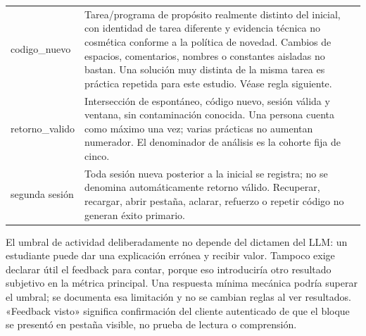 \documentclass[11pt,a4paper]{report}
\begin{document}
\begin{longtable}{P{3.1cm}P{12.9cm}}
codigo\_nuevo & Tarea/programa de propósito realmente distinto del inicial, con identidad de tarea diferente y evidencia técnica no cosmética conforme a la política de novedad. Cambios de espacios, comentarios, nombres o constantes aisladas no bastan. Una solución muy distinta de la misma tarea es práctica repetida para este estudio. Véase regla siguiente.\\
retorno\_valido & Intersección de espontáneo, código nuevo, sesión válida y ventana, sin contaminación conocida. Una persona cuenta como máximo una vez; varias prácticas no aumentan numerador. El denominador de análisis es la cohorte fija de cinco.\\
segunda sesión & Toda sesión nueva posterior a la inicial se registra; no se denomina automáticamente retorno válido. Recuperar, recargar, abrir pestaña, aclarar, refuerzo o repetir código no generan éxito primario.\\\bottomrule
\end{longtable}

El umbral de actividad deliberadamente no depende del dictamen del LLM: un estudiante puede dar una explicación errónea y recibir valor. Tampoco exige declarar útil el feedback para contar, porque eso introduciría otro resultado subjetivo en la métrica principal. Una respuesta mínima mecánica podría superar el umbral; se documenta esa limitación y no se cambian reglas al ver resultados. «Feedback visto» significa confirmación del cliente autenticado de que el bloque se presentó en pestaña visible, no prueba de lectura o comprensión.
\end{document}
